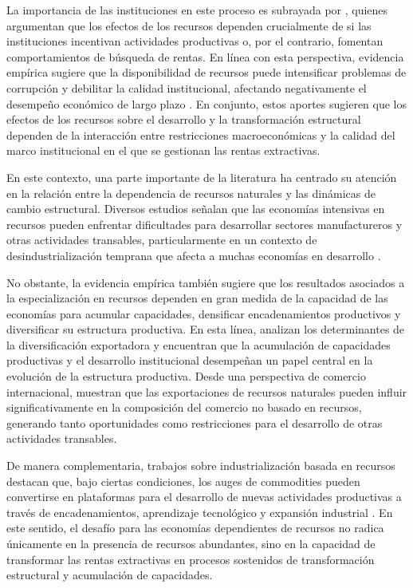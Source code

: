 \documentclass[../../TFM.tex]{subfiles}
\begin{document}
	La importancia de las instituciones en este proceso es subrayada por \textcite{Mehlum2006}, quienes argumentan que los efectos de los recursos dependen crucialmente de si las instituciones incentivan actividades productivas o, por el contrario, fomentan comportamientos de búsqueda de rentas. En línea con esta perspectiva, evidencia empírica sugiere que la disponibilidad de recursos puede intensificar problemas de corrupción y debilitar la calidad institucional, afectando negativamente el desempeño económico de largo plazo \parencite{Bhattacharyya2010}. En conjunto, estos aportes sugieren que los efectos de los recursos sobre el desarrollo y la transformación estructural dependen de la interacción entre restricciones macroeconómicas y la calidad del marco institucional en el que se gestionan las rentas extractivas.

	En este contexto, una parte importante de la literatura ha centrado su atención en la relación entre la dependencia de recursos naturales y las dinámicas de cambio estructural. Diversos estudios señalan que las economías intensivas en recursos pueden enfrentar dificultades para desarrollar sectores manufactureros y otras actividades transables, particularmente en un contexto de desindustrialización temprana que afecta a muchas economías en desarrollo \textcite{Rodrik2016}.

	No obstante, la evidencia empírica también sugiere que los resultados asociados a la especialización en recursos dependen en gran medida de la capacidad de las economías para acumular capacidades, densificar encadenamientos productivos y diversificar su estructura productiva. En esta línea, \textcite{Agosin2012} analizan los determinantes de la diversificación exportadora y encuentran que la acumulación de capacidades productivas y el desarrollo institucional desempeñan un papel central en la evolución de la estructura productiva. Desde una perspectiva de comercio internacional, \textcite{Harding2016} muestran que las exportaciones de recursos naturales pueden influir significativamente en la composición del comercio no basado en recursos, generando tanto oportunidades como restricciones para el desarrollo de otras actividades transables.

	De manera complementaria, trabajos sobre industrialización basada en recursos destacan que, bajo ciertas condiciones, los auges de commodities pueden convertirse en plataformas para el desarrollo de nuevas actividades productivas a través de encadenamientos, aprendizaje tecnológico y expansión industrial \parencite{Morris2013}. En este sentido, el desafío para las economías dependientes de recursos no radica únicamente en la presencia de recursos abundantes, sino en la capacidad de transformar las rentas extractivas en procesos sostenidos de transformación estructural y acumulación de capacidades.
\end{document}
